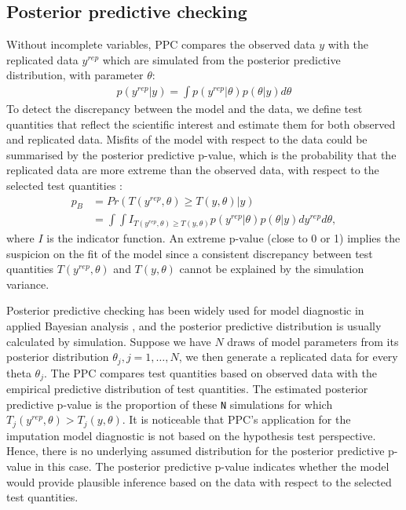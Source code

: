 	\subsection{Posterior predictive checking}
	Without incomplete variables, PPC compares the observed data $y$ with the replicated data $y^{rep}$ which are simulated from the posterior predictive distribution, with parameter $\theta$:
	\begin{equation}
		\begin{array}{ll}
			p(y^{rep}|y) = \int p(y^{rep}|\theta)p(\theta|y)d\theta
		\end{array} 
	\end{equation}
	To detect the discrepancy between the model and the data, we define test quantities that reflect the scientific interest and estimate them for both observed and replicated data. Misfits of the model with respect to the data could be summarised by the posterior predictive p-value, which is the probability that the replicated data are more extreme than the observed data, with respect to the selected test quantities \citep{gelman2013bayesian}:
	\begin{equation}
		\begin{array}{ll}
			p_{B} &= Pr(T(y^{rep}, \theta) \ge T(y, \theta)|y)\\
			&= \int\int I_{T(y^{rep}, \theta) \ge T(y, \theta)}p(y^{rep}|\theta)p(\theta|y)dy^{rep}d\theta,
		\end{array} 
	\end{equation}
	where $I$ is the indicator function. An extreme p-value (close to 0 or 1) implies the suspicion on the fit of the model since a consistent discrepancy between test quantities $T(y^{rep}, \theta)$ and $T(y, \theta)$ cannot be explained by the simulation variance. 
	
	Posterior predictive checking has been widely used for model diagnostic in applied Bayesian analysis \citep[chapter 6]{gelman2013bayesian}, and the posterior predictive distribution is usually calculated by simulation. Suppose we have $N$ draws of model parameters from its posterior distribution $\theta_j, j=1,\dots,N$, we then generate a replicated data for every theta $\theta_j$. The PPC compares test quantities based on observed data with the empirical predictive distribution of test quantities. The estimated posterior predictive p-value is the proportion of these \texttt{N} simulations for which $T_{j}(y^{rep}, \theta) > T_{j}(y, \theta)$. It is noticeable that PPC's application for the imputation model diagnostic is not based on the hypothesis test perspective. Hence, there is no underlying assumed distribution for the posterior predictive p-value in this case. The posterior predictive p-value indicates whether the model would provide plausible inference based on the data with respect to the selected test quantities. 
	
